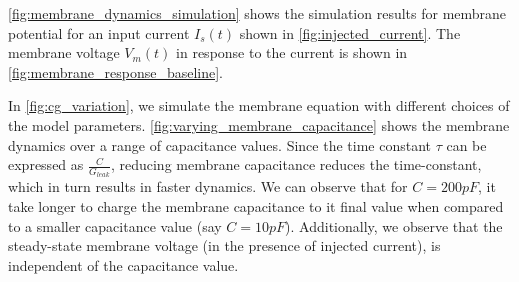 \documentclass[10pt,onecolumn]{article}
\begin{document}
    \cref{fig:membrane_dynamics_simulation} shows the simulation results for membrane potential for an input current $I_{s}(t)$ shown in \cref{fig:injected_current}.
    The membrane voltage $V_{m}(t)$ in response to the current is shown in \cref{fig:membrane_response_baseline}.

    In \cref{fig:cg_variation}, we simulate the membrane equation with different choices of the model parameters.
    \cref{fig:varying_membrane_capacitance} shows the membrane dynamics over a range of capacitance values.
    Since the time constant $\tau$ can be expressed as $\frac{C}{G_{leak}}$, reducing membrane capacitance reduces the time-constant, which in turn results in faster dynamics.
    We can observe that for $C=200pF$, it take longer to charge the membrane capacitance to it final value when compared to a smaller capacitance value (say $C=10pF$).
    Additionally, we observe that the steady-state membrane voltage (in the presence of injected current), is independent of the capacitance value.
\end{document}
